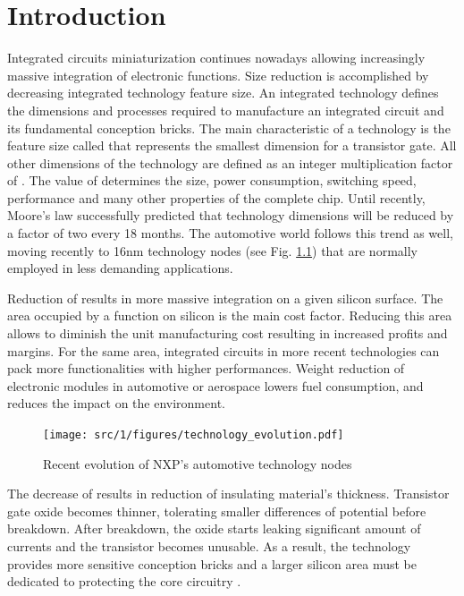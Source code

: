 \chapter{Introduction}

Integrated circuits miniaturization continues nowadays allowing increasingly massive integration of electronic functions.
Size reduction is accomplished by decreasing integrated technology feature size.
An integrated technology defines the dimensions and processes required to manufacture an integrated circuit and its fundamental conception bricks.
The main characteristic of a technology is the feature size called \textlambda{} that represents the smallest dimension for a transistor gate.
All other dimensions of the technology are defined as an integer multiplication factor of \textlambda{}.
The value of \textlambda{} determines the size, power consumption, switching speed, performance and many other properties of the complete chip.
Until recently, Moore's law successfully predicted that technology dimensions will be reduced by a factor of two every 18 months.
The automotive world follows this trend as well, moving recently to 16nm technology nodes (see Fig. \ref{fig:nxp-techno-increase}) \cite{evolution_technologies} that are normally employed in less demanding applications.

Reduction of \textlambda{} results in more massive integration on a given silicon surface.
The area occupied by a function on silicon is the main cost factor.
Reducing this area allows to diminish the unit manufacturing cost resulting in increased profits and margins.
For the same area, integrated circuits in more recent technologies can pack more functionalities with higher performances.
Weight reduction of electronic modules in automotive or aerospace lowers fuel consumption, and reduces the impact on the environment.

\begin{figure}[!h]
  \centering
  \texttt{[image: src/1/figures/technology\_evolution.pdf]}
  \caption{Recent evolution of NXP's automotive technology nodes \cite{evolution_technologies}}
  \label{fig:nxp-techno-increase}
\end{figure}

The decrease of \textlambda{} results in reduction of insulating material's thickness.
Transistor gate oxide becomes thinner, tolerating smaller differences of potential before breakdown.
After breakdown, the oxide starts leaking significant amount of currents and the transistor becomes unusable.
As a result, the technology provides more sensitive conception bricks and a larger silicon area must be dedicated to protecting the core circuitry \cite{evolution_technologies}.


